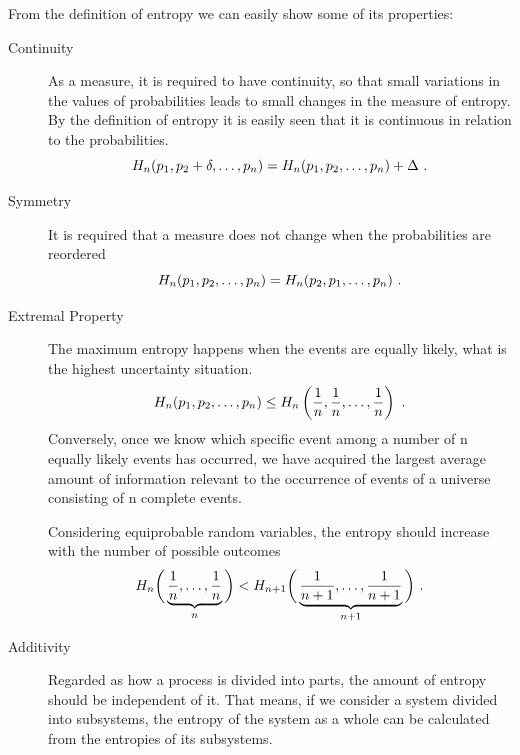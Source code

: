 From the definition of entropy we can easily show some of its properties:
\begin{description}
\item[Continuity]
As a measure, it is required to have continuity, so that small variations in the values of probabilities 
leads to small changes in the measure of entropy. By the definition of entropy it is easily seen that it is 
continuous in relation to the probabilities.
\begin{equation}
H_n(p_1, p_2 + \delta, \ldots, p_n) = H_n(p_1, p_2, \ldots, p_n) + \Delta \textmd{ .}
\label{eq:entropy-continuity}
\end{equation}

\item[Symmetry]
It is required that a measure does not change when the probabilities are reordered
\begin{equation}
H_n(p_1, p_2, \ldots, p_n) = H_n(p_2, p_1, \ldots, p_n) \textmd{ .}
\label{eq:entropy-symmetry}
\end{equation}

\item[Extremal Property]
The maximum entropy happens when the events are equally likely, what is the highest uncertainty situation.
\begin{equation}
H_n(p_1, p_2, \ldots, p_n) \leq H_n\left(\frac{1}{n}, \frac{1}{n}, \ldots, \frac{1}{n}\right)  \textmd{ .}
\label{eq:maximum-entropy}
\end{equation}
Conversely, once we know which specific event among a number of n equally likely events has occurred, 
we have acquired the largest average amount of information relevant to the occurrence of events of a 
universe consisting of n complete events.

Considering equiprobable random variables, the entropy should increase with the number of possible outcomes
\begin{equation}
H_n\bigg(\underbrace{\frac{1}{n}, \ldots, \frac{1}{n}}_{n}\bigg)
<
H_{n+1}\bigg(\underbrace{\frac{1}{n+1}, \ldots, \frac{1}{n+1}}_{n+1}\bigg) \textmd{ .}
\label{eq:maximum-entropy-equiprobable}
\end{equation}

\item[Additivity]
Regarded as how a process is divided into parts, the amount of entropy should be independent of it. 
That means, if we consider a system divided into subsystems, the entropy of the system as a whole 
can be calculated from the entropies of its subsystems. 


\end{description}

